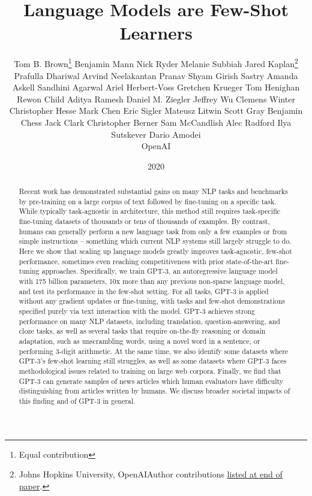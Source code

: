 \documentclass{article}
\title{Language Models are Few-Shot Learners}
\author{
Tom B. Brown\thanks{Equal contribution}
\And
Benjamin Mann\footnotemark[1]
\And
Nick Ryder\footnotemark[1]
\And
Melanie Subbiah\footnotemark[1]
\AND
Jared Kaplan\thanks{Johns Hopkins University, OpenAI\newline\newline Author contributions \hyperref[sec:contributions]{listed at end of paper}.}
\And
Prafulla Dhariwal
\And
Arvind Neelakantan
\And
Pranav Shyam
\And
Girish Sastry
\And
Amanda Askell
\And
Sandhini Agarwal
\And
Ariel Herbert-Voss
\And
Gretchen Krueger
\And
Tom Henighan
\And
Rewon Child
\And
Aditya Ramesh
\And
Daniel M. Ziegler
\And
Jeffrey Wu
\And
Clemens Winter
\AND
Christopher Hesse
\And
Mark Chen
\And
Eric Sigler
\And
Mateusz Litwin
\And
Scott Gray
\AND
Benjamin Chess
\And
Jack Clark
\And
Christopher Berner
\AND
Sam McCandlish
\And
Alec Radford
\And
Ilya Sutskever
\And
Dario Amodei 
\AND
\\
{\large OpenAI}
}
\date{2020}
\begin{document}
\maketitle
\begin{abstract}
   Recent work has demonstrated substantial gains on many NLP tasks and benchmarks by pre-training on a large corpus of text followed by fine-tuning on a specific task. While typically task-agnostic in architecture, this method still requires task-specific fine-tuning datasets of thousands or tens of thousands of examples. By contrast, humans can generally perform a new language task from only a few examples or from simple instructions – something which current NLP systems still largely struggle to do. Here we show that scaling up language models greatly improves task-agnostic, few-shot performance, sometimes even reaching competitiveness with prior state-of-the-art fine-tuning approaches. Specifically, we train GPT-3, an autoregressive language model with 175 billion parameters, 10x more than any previous non-sparse language model, and test its performance in the few-shot setting.  For all tasks, GPT-3 is applied without any gradient updates or fine-tuning, with tasks and few-shot demonstrations specified purely via text interaction with the model.  GPT-3 achieves strong performance on many NLP datasets, including translation, question-answering, and cloze tasks, as well as several tasks that require on-the-fly reasoning or domain adaptation, such as unscrambling words, using a novel word in a sentence, or performing 3-digit arithmetic. At the same time, we also identify some datasets where GPT-3's few-shot learning still struggles, as well as some datasets where GPT-3 faces methodological issues related to training on large web corpora. Finally, we find that GPT-3 can generate samples of news articles which human evaluators have difficulty distinguishing from articles written by humans.  We discuss broader societal impacts of this finding and of GPT-3 in general. \end{abstract}


\newpage
\setcounter{tocdepth}{2}
\tableofcontents
\newpage

\setcounter{footnote}{0}
\makeatletter
\let\@fnsymbol\@arabic
\makeatother
\end{document}
